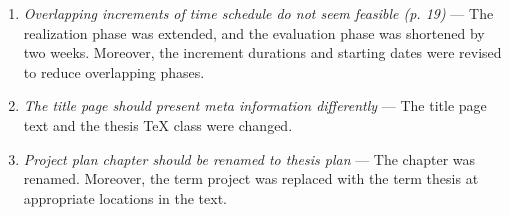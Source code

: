 \begin{enumerate}[label=Q\arabic*.]
    \item \textit{Overlapping increments of time schedule do not seem feasible (p. 19)} --- The realization phase was extended, and the evaluation phase was shortened by two weeks. Moreover, the increment durations and starting dates were revised to reduce overlapping phases.
    \item \textit{The title page should present meta information differently} --- The title page text and the thesis TeX class were changed.
    \item \textit{Project plan chapter should be renamed to thesis plan} --- The chapter was renamed. Moreover, the term project was replaced with the term thesis at appropriate locations in the text.
\end{enumerate}
